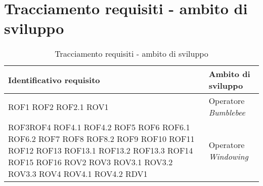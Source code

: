 \section{Tracciamento requisiti - ambito di sviluppo}
{
\centering
\begin{longtable}{L{5cm} L{8.5cm}}
\caption{Tracciamento requisiti - ambito di sviluppo}\\
\textbf{Identificativo requisito} &
\textbf{Ambito di sviluppo}\\
\endhead
\hline

ROF1 \newline ROF2 \newline ROF2.1 \newline ROV1 & Operatore \textit{Bumblebee} \\
\hline
ROF3\newline ROF4 \newline ROF4.1 \newline ROF4.2 \newline ROF5 \newline ROF6 \newline ROF6.1 \newline ROF6.2 \newline ROF7 \newline ROF8 \newline ROF8.2 \newline ROF9 \newline ROF10 \newline ROF11 \newline ROF12 \newline ROF13 \newline ROF13.1 \newline ROF13.2 \newline ROF13.3 \newline ROF14 \newline ROF15 \newline ROF16 \newline ROV2 \newline ROV3 \newline ROV3.1 \newline ROV3.2 \newline ROV3.3 \newline ROV4 \newline ROV4.1 \newline ROV4.2 \newline RDV1 & Operatore \textit{Windowing} \\
\hline

\end{longtable}}
